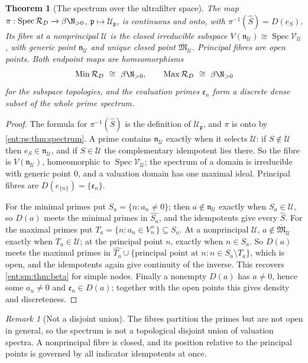 \documentclass[11pt]{article}
\newtheorem{theorem}{Theorem}[section]
\theoremstyle{plain}
\theoremstyle{plain}
\theoremstyle{plain}
\theoremstyle{definition}
\theoremstyle{definition}
\theoremstyle{definition}
\theoremstyle{definition}
\theoremstyle{remark}
\newtheorem{remark}[remark]{Remark}
\DeclareMathOperator{\Spec}{Spec}\DeclareMathOperator{\red}{red}
\newcommand{\RD}{\mathcal R_D}\newcommand{\Ucal}{\mathcal U}
\begin{document}
\begin{theorem}[The spectrum over the ultrafilter space]
\label{ent:ps:thm:topology}
The map $\pi:\Spec\RD\to\beta\N_{>0}$, $\mathfrak p\mapsto\Ucal_{\mathfrak
p}$, is continuous and onto, with $\pi^{-1}(\widehat S)=D(e_S)$. Its fibre at
a nonprincipal $\Ucal$ is the closed irreducible subspace
$V(\mathfrak n_\Ucal)\cong\Spec\mathcal V_\Ucal$, with generic point
$\mathfrak n_\Ucal$ and unique closed point $\overline{\mathfrak M}_\Ucal$.
Principal fibres are open points. Both endpoint maps are homeomorphisms
\[
 \operatorname{Min}\RD\ \cong\ \beta\N_{>0},\qquad
 \operatorname{Max}\RD\ \cong\ \beta\N_{>0}
\]
for the subspace topologies, and the evaluation primes $\mathfrak e_n$ form a
discrete dense subset of the \emph{whole} prime spectrum.
\end{theorem}
\begin{proof}
The formula for $\pi^{-1}(\widehat S)$ is the definition of
$\Ucal_{\mathfrak p}$, and $\pi$ is onto by \cref{ent:ps:thm:spectrum}. A
prime contains $\mathfrak n_\Ucal$ exactly when it selects $\Ucal$: if
$S\notin\Ucal$ then $e_S\in\mathfrak n_\Ucal$, and if $S\in\Ucal$ the
complementary idempotent lies there. So the fibre is $V(\mathfrak n_\Ucal)$,
homeomorphic to $\Spec\mathcal V_\Ucal$; the spectrum of a domain is
irreducible with generic point $0$, and a valuation domain has one maximal
ideal. Principal fibres are $D(e_{\{n\}})=\{\mathfrak e_n\}$.

For the minimal primes put $S_a=\{n:a_n\ne0\}$; then $a\notin\mathfrak
n_\Ucal$ exactly when $S_a\in\Ucal$, so $D(a)$ meets the minimal primes in
$\widehat{S_a}$, and the idempotents give every $\widehat S$. For the maximal
primes put $T_a=\{n:a_n\in V_n^\times\}\subseteq S_a$. At a nonprincipal
$\Ucal$, $a\notin\overline{\mathfrak M}_\Ucal$ exactly when $T_a\in\Ucal$; at
the principal point $n$, exactly when $n\in S_a$. So $D(a)$ meets the maximal
primes in
$\widehat{T_a}\cup\{\text{principal point at }n:n\in S_a\setminus T_a\}$,
which is open, and the idempotents again give continuity of the inverse. This
recovers \cref{ent:sm:thm:beta} for simple nodes. Finally a nonempty $D(a)$
has $a\ne0$, hence some $a_n\ne0$ and $\mathfrak e_n\in D(a)$; together with
the open points this gives density and discreteness.
\end{proof}

\begin{remark}[Not a disjoint union]
The fibres partition the primes but are not open in general, so the spectrum
is not a topological disjoint union of valuation spectra. A nonprincipal
fibre is closed, and its position relative to the principal points is
governed by all indicator idempotents at once.
\end{remark}
\end{document}
